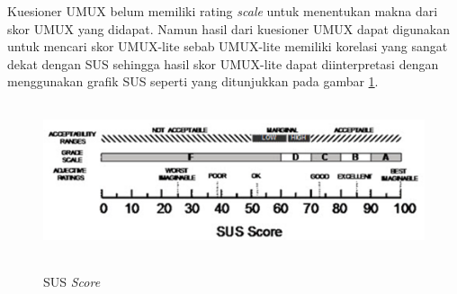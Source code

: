 Kuesioner UMUX belum memiliki rating \textit{scale} untuk menentukan makna dari skor UMUX yang didapat. Namun hasil dari kuesioner UMUX dapat digunakan untuk mencari skor UMUX-lite sebab UMUX-lite memiliki korelasi yang sangat dekat dengan SUS \citep{article} sehingga hasil skor UMUX-lite dapat diinterpretasi dengan menggunakan grafik SUS seperti yang ditunjukkan pada gambar \ref*{sus}.

\begin{figure}[H]
	\centering
	{\includegraphics [width = 13cm, height= 4.5cm]{gambar/sus}}
	\caption{SUS \textit{Score} \citep{bangor2009determining}}
	\label{sus}
\end{figure}



\fancyhf{} 
\fancyfoot[R]{\thepage}

